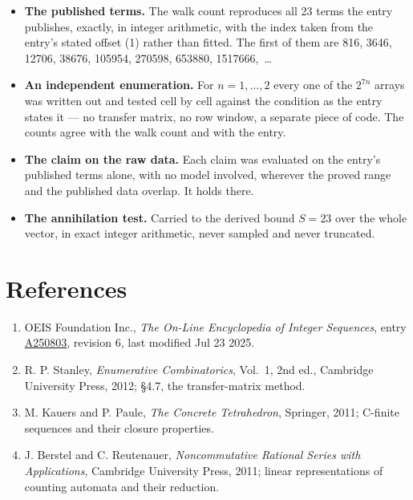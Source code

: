 \documentclass[11pt]{article}
\theoremstyle{definition}
\begin{document}
\begin{itemize}

\item {\bfseries The published terms.} The walk count reproduces all 23 terms the entry publishes, exactly, in integer arithmetic, with the index taken from the entry's stated offset (1) rather than fitted. The first of them are 816, 3646, 12706, 38676, 105954, 270598, 653880, 1517666,~\dots

\item {\bfseries An independent enumeration.} For $n = 1,\dots,2$ every one of the $2^{7n}$ arrays was written out and tested cell by cell against the condition as the entry states it --- no transfer matrix, no row window, a separate piece of code. The counts agree with the walk count and with the entry.

\item {\bfseries The claim on the raw data.} Each claim was evaluated on the entry's published terms alone, with no model involved, wherever the proved range and the published data overlap. It holds there.

\item {\bfseries The annihilation test.} Carried to the derived bound $S = 23$ over the whole vector, in exact integer arithmetic, never sampled and never truncated.

\end{itemize}

\section{References}

\begin{enumerate}

\item OEIS Foundation Inc., \emph{The On-Line Encyclopedia of Integer Sequences}, entry \href{https://oeis.org/A250803}{A250803}, revision 6, last modified Jul 23 2025.

\item R. P. Stanley, \emph{Enumerative Combinatorics}, Vol.~1, 2nd ed., Cambridge University Press, 2012; \S4.7, the transfer-matrix method.

\item M. Kauers and P. Paule, \emph{The Concrete Tetrahedron}, Springer, 2011; C-finite sequences and their closure properties.

\item J. Berstel and C. Reutenauer, \emph{Noncommutative Rational Series with Applications}, Cambridge University Press, 2011; linear representations of counting automata and their reduction.

\end{enumerate}
\end{document}
